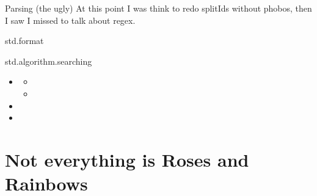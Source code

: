 \documentclass[aspectratio=169,notes]{beamer}
\begin{document}
	\begin{frame}[fragile]{Parsing (the ugly)}
At this point I was think to redo splitIds without phobos, then I saw I missed to
talk about regex.
	\end{frame}

	\begin{frame}[fragile]{std.format}
		
	\end{frame}

	\begin{frame}[fragile]{std.algorithm.searching}
		\begin{itemize}
			\item \lstinline@find@
			\begin{itemize}
				\item \lstinline@canFind@
				\item \lstinline@countUntil@
			\end{itemize}
			\item \lstinline@startsWith@
			\item \lstinline@endsWith@
		\end{itemize}
	\end{frame}

	\section{Not everything is Roses and Rainbows}
\end{document}
